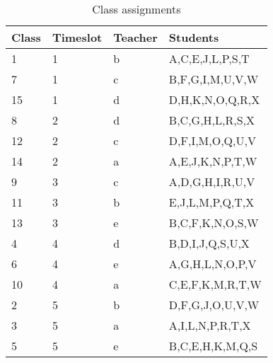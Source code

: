 \documentclass[11pt]{article}
\begin{document}
\begin{table}
\hspace*{-3cm}
\Huge
\begin{tabular}{|l|l|l|l|} \hline
\rowcolor{gray!45}
Class & Timeslot & Teacher & Students \\ \hline \hline
1 & 1 & b & A,C,E,J,L,P,S,T \\ \hline
7 & 1 & c & B,F,G,I,M,U,V,W \\ \hline
15 & 1 & d & D,H,K,N,O,Q,R,X \\ \hline
\rowcolor{gray!30}
8 & 2 & d & B,C,G,H,L,R,S,X \\ \hline
\rowcolor{gray!30}
12 & 2 & c & D,F,I,M,O,Q,U,V \\ \hline
\rowcolor{gray!30}
14 & 2 & a & A,E,J,K,N,P,T,W \\ \hline
9 & 3 & c & A,D,G,H,I,R,U,V \\ \hline
11 & 3 & b & E,J,L,M,P,Q,T,X \\ \hline
13 & 3 & e & B,C,F,K,N,O,S,W \\ \hline
\rowcolor{gray!30}
4 & 4 & d & B,D,I,J,Q,S,U,X \\ \hline
\rowcolor{gray!30}
6 & 4 & e & A,G,H,L,N,O,P,V \\ \hline
\rowcolor{gray!30}
10 & 4 & a & C,E,F,K,M,R,T,W \\ \hline
2 & 5 & b & D,F,G,J,O,U,V,W \\ \hline
3 & 5 & a & A,I,L,N,P,R,T,X \\ \hline
5 & 5 & e & B,C,E,H,K,M,Q,S \\ \hline
\end{tabular}
\caption{Class assignments}
\label{table:ass}
\end{table}
\end{document}
